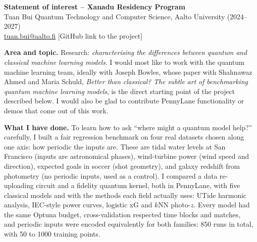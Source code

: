 \documentclass[11pt,a4paper]{article}
\newcommand{\fillin}[1]{\textcolor{orange!80!black}{[#1]}}
\begin{document}
{\large\textbf{Statement of interest -- Xanadu Residency Program}}\\
Tuan Bui \;\textbullet\; Quantum Technology and Computer Science, Aalto University (2024--2027)\\
\href{mailto:tuan.bui@aalto.fi}{tuan.bui@aalto.fi} \;\textbullet\; \fillin{GitHub link to the project}

\textbf{Area and topic.} Research: \emph{characterising the differences between quantum and
classical machine learning models}. I would most like to work with the quantum machine learning
team, ideally with Joseph Bowles, whose paper with Shahnawaz Ahmed and Maria Schuld,
\emph{Better than classical? The subtle art of benchmarking quantum machine learning models}, is
the direct starting point of the project described below. I would also be glad to contribute
PennyLane functionality or demos that come out of this work.

\textbf{What I have done.} To learn how to ask ``where might a quantum model help?'' carefully,
I built a fair regression benchmark on four real datasets chosen along one axis: how periodic
the inputs are. These are tidal water levels at San Francisco (inputs are astronomical phases),
wind-turbine power (wind speed and direction), expected goals in soccer (shot geometry), and
galaxy redshift from photometry (no periodic inputs, used as a control). I compared a data
re-uploading circuit and a fidelity quantum kernel, both in PennyLane, with five classical models
and with the methods each field actually uses: UTide harmonic analysis, IEC-style power
curves, logistic xG and $k$NN photo-$z$. Every model had the same Optuna budget, cross-validation
respected time blocks and matches, and periodic inputs were encoded equivalently for both
families: 850 runs in total, with 50 to 1000 training points.
\end{document}
